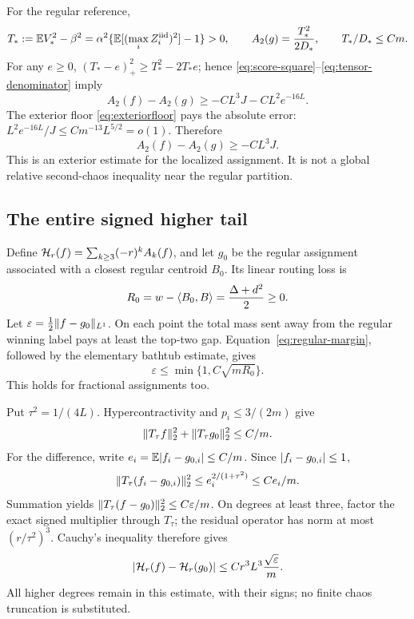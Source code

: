 For the regular reference,
\[
 T_*:=\mathbb E V_*^2-\beta^2
      =\alpha^2\{\mathbb E[(\max_i Z_i^{\rm iid})^2]-1\}>0,
 \qquad A_2(g)=\frac{T_*^2}{2D_*},\qquad T_*/D_*\le Cm.
\]
For any $e\ge0$, $(T_*-e)_+^2\ge T_*^2-2T_*e$; hence
\eqref{eq:score-square}--\eqref{eq:tensor-denominator} imply
\[
 A_2(f)-A_2(g)\ge-CL^3J-CL^2e^{-16L}.
\]
The exterior floor \eqref{eq:exteriorfloor} pays the absolute error:
$L^2e^{-16L}/J\le C m^{-13}L^{5/2}=o(1)$. Therefore
\begin{equation}\label{eq:exteriorA2}
                         A_2(f)-A_2(g)\ge-CL^3J.
\end{equation}
This is an exterior estimate for the localized assignment. It is not a
global relative second-chaos inequality near the regular partition.

\subsection{The entire signed higher tail}
Define $\mathcal H_r(f)=\sum_{k\ge3}(-r)^kA_k(f)$, and let $g_0$ be the
regular assignment associated with a closest regular centroid $B_0$.
Its linear routing loss is
\[
 R_0=w-\langle B_0,B\rangle=\frac{\Delta+d^2}{2}\ge0.
\]
Let $\varepsilon=\frac12\lVert f-g_0\rVert_{L^1}$.
On each point the total mass sent away from the regular winning label
pays at least the top-two gap. Equation~\eqref{eq:regular-margin},
followed by the elementary bathtub estimate, gives
\begin{equation}\label{eq:epsilon-routing}
                  \varepsilon\le\min\{1,C\sqrt{mR_0}\}.
\end{equation}
This holds for fractional assignments too.

Put $\tau^2=1/(4L)$. Hypercontractivity and $p_i\le3/(2m)$ give
\[
 \lVert T_\tau f\rVert_2^2+\lVert T_\tau g_0\rVert_2^2\le C/m.
\]
For the difference, write $e_i=\mathbb E\lvert f_i-g_{0,i}\rvert\le C/m$.
Since $\lvert f_i-g_{0,i}\rvert\le1$,
\[
 \lVert T_\tau(f_i-g_{0,i})\rVert_2^2
    \le e_i^{2/(1+\tau^2)}\le Ce_i/m.
\]
Summation yields $\lVert T_\tau(f-g_0)\rVert_2^2\le C\varepsilon/m$.
On degrees at least three, factor the exact signed multiplier through
$T_\tau$; the residual operator has norm at most $(r/\tau^2)^3$.
Cauchy's inequality therefore gives
\begin{equation}\label{eq:HC-tail}
       \lvert \mathcal H_r(f)-\mathcal H_r(g_0)\rvert
                         \le Cr^3L^3\frac{\sqrt\varepsilon}{m}.
\end{equation}
All higher degrees remain in this estimate, with their signs; no finite
chaos truncation is substituted.

